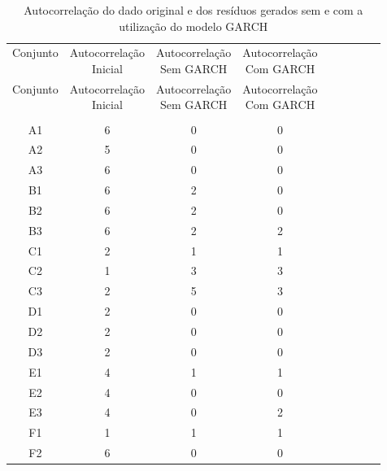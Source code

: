 \begin{center}
\begin{longtable}{ccccc|cccc}
\toprule
\rowcolor{white}
\caption[Metodologia I: evolução da autocorrelação]{Autocorrelação do dado
original e dos resíduos gerados sem e com a utilização do modelo GARCH}
\label{tab:EvolucaoAutocorrelacaoMet1}\\
\midrule
Conjunto & \specialcell{Autocorrelação\\Inicial} & \specialcell{Autocorrelação\\Sem
GARCH} & \specialcell{Autocorrelação\\Com GARCH} \\
\midrule
\endfirsthead 
\midrule
\rowcolor{white}
Conjunto & \specialcell{Autocorrelação\\Inicial} & \specialcell{Autocorrelação\\Sem
GARCH} & \specialcell{Autocorrelação\\Com GARCH} \\
\toprule
\endhead
\midrule \\ %
\endfoot
\bottomrule 
\endlastfoot
    A1    & 6     & 0     & 0 \\
    A2    & 5     & 0     & 0 \\
    A3    & 6     & 0     & 0 \\
    B1    & 6     & 2     & 0 \\
    B2    & 6     & 2     & 0 \\
    B3    & 6     & 2     & 2 \\
    C1    & 2     & 1     & 1 \\
    C2    & 1     & 3     & 3 \\
    C3    & 2     & 5     & 3 \\
    D1    & 2     & 0     & 0 \\
    D2    & 2     & 0     & 0 \\
    D3    & 2     & 0     & 0 \\
    E1    & 4     & 1     & 1 \\
    E2    & 4     & 0     & 0 \\
    E3    & 4     & 0     & 2 \\
    F1    & 1     & 1     & 1 \\
    F2    & 6     & 0     & 0 \\

\end{longtable}
\end{center}
